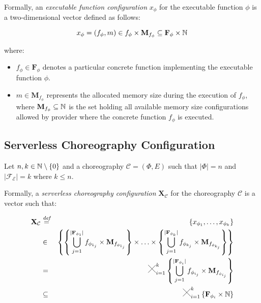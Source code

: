 Formally, an \textit{executable function configuration} $x_{\phi}$ for the executable function $\phi$ is a two-dimensional vector defined as follows:

\begin{equation}
x_{\phi} = (f_{\phi},m) \in f_{\phi} \times \textbf{M}_{f_{\phi}} \subseteq \textbf{F}_{\phi} \times \mathbb{N}
\end{equation}

where:

\begin{itemize}
	\item $f_{\phi} \in \textbf{F}_{\phi}$  denotes a particular concrete function implementing the executable function $\phi$.
	\item $m \in \textbf{M}_{f_{\phi}}$ represents the allocated memory size during the execution of $f_{\phi}$, where $\textbf{M}_{f_{\phi}} \subseteq \mathbb{N}$ is the set holding all available memory size configurations allowed by provider where the concrete function $f_{\phi}$ is executed.
\end{itemize}

\subsection{Serverless Choreography Configuration}

Let $n,k \in \mathbb{N} \setminus \left\lbrace 0 \right\rbrace$ and a choreography $\mathcal{C} = (\Phi,E)$ such that $|\Phi| = n$ and $|\mathscr{F_E}| = k$ where $k \leq n$.

Formally, a \textit{serverless choreography configuration} $\textbf{X}_{\mathcal{C}}$ for the choreography $\mathcal{C}$ is a vector such that:

\begin{eqnarray}
\textbf{X}_{\mathcal{C}} & \mathDef & \left\lbrace x_{\phi_{1}}, \ldots, x_{\phi_{k}} \right\rbrace \nonumber \\ 
& \in & \left\{  \left\{ \bigcup_{j=1}^{|\textbf{F}_{\phi_{1}}|} f_{\phi_{1_j}} \times \textbf{M}_{f_{\phi_{1_j}}} \right\} \times \ldots \times \left\{ \bigcup_{j=1}^{|\textbf{F}_{\phi_{k}}|} f_{\phi_{k_j}} \times \textbf{M}_{f_{\phi_{k_j}}} \right\} \right\}  \nonumber \\
& = & \Cross_{i = 1}^k \left\{ \bigcup_{j=1}^{|\textbf{F}_{\phi_{i}}|} f_{\phi_{i_j}} \times \textbf{M}_{f_{\phi_{i_j}}} \right\} \nonumber \\
& \subseteq & \Cross_{i = 1}^k \left\{ \textbf{F}_{\phi_{i}} \times \mathbb{N} \right\}
\end{eqnarray}

